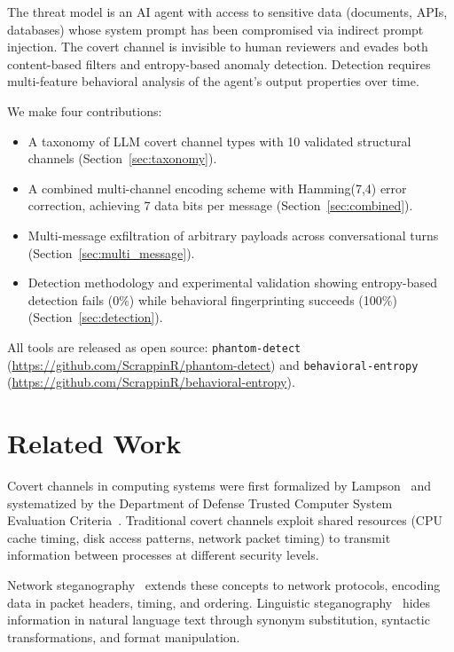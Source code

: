 \documentclass[11pt]{article}
\begin{document}
The threat model is an AI agent with access to sensitive data (documents,
APIs, databases) whose system prompt has been compromised via indirect
prompt injection. The covert channel is invisible to human reviewers and
evades both content-based filters and entropy-based anomaly detection.
Detection requires multi-feature behavioral analysis of the agent's
output properties over time.

We make four contributions:
\begin{itemize}
  \item A taxonomy of LLM covert channel types with 10 validated
    structural channels (Section~\ref{sec:taxonomy}).
  \item A combined multi-channel encoding scheme with Hamming(7,4) error
    correction, achieving 7 data bits per message
    (Section~\ref{sec:combined}).
  \item Multi-message exfiltration of arbitrary payloads across
    conversational turns (Section~\ref{sec:multi_message}).
  \item Detection methodology and experimental validation showing
    entropy-based detection fails (0\%) while behavioral fingerprinting
    succeeds (100\%) (Section~\ref{sec:detection}).
\end{itemize}

All tools are released as open source: \texttt{phantom-detect}
(\url{https://github.com/ScrappinR/phantom-detect}) and
\texttt{behavioral-entropy}
(\url{https://github.com/ScrappinR/behavioral-entropy}).

\section{Related Work}

Covert channels in computing systems were first formalized by
Lampson~\cite{lampson1973} and systematized by the Department of Defense
Trusted Computer System Evaluation Criteria~\cite{tcsec1985}. Traditional
covert channels exploit shared resources (CPU cache timing, disk access
patterns, network packet timing) to transmit information between processes
at different security levels.

Network steganography~\cite{mazurczyk2016} extends these concepts to network
protocols, encoding data in packet headers, timing, and ordering.
Linguistic steganography~\cite{chang2014} hides information in natural
language text through synonym substitution, syntactic transformations, and
format manipulation.
\end{document}
